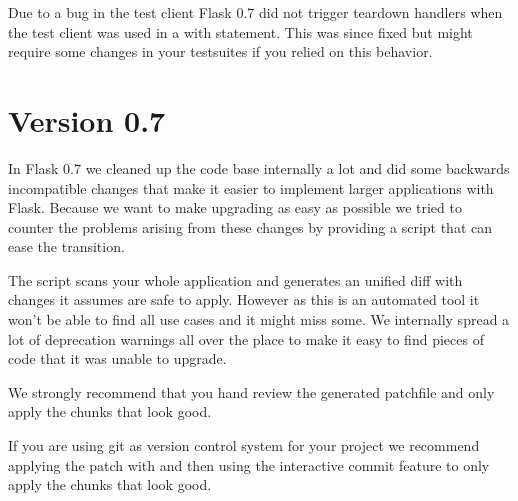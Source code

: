 \documentclass[a4paper,12pt]{sphinxmanual}
\begin{document}
Due to a bug in the test client Flask 0.7 did not trigger teardown
handlers when the test client was used in a with statement.  This was
since fixed but might require some changes in your testsuites if you
relied on this behavior.


\section{Version 0.7}
\label{upgrading:version-0-7}
In Flask 0.7 we cleaned up the code base internally a lot and did some
backwards incompatible changes that make it easier to implement larger
applications with Flask.  Because we want to make upgrading as easy as
possible we tried to counter the problems arising from these changes by
providing a script that can ease the transition.

The script scans your whole application and generates an unified diff with
changes it assumes are safe to apply.  However as this is an automated
tool it won't be able to find all use cases and it might miss some.  We
internally spread a lot of deprecation warnings all over the place to make
it easy to find pieces of code that it was unable to upgrade.

We strongly recommend that you hand review the generated patchfile and
only apply the chunks that look good.

If you are using git as version control system for your project we
recommend applying the patch with  and then
using the interactive commit feature to only apply the chunks that look
good.
\end{document}
